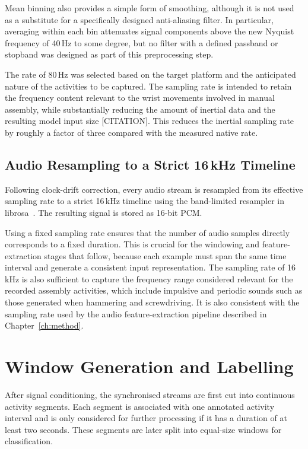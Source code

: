 Mean binning also provides a simple form of smoothing, although it is not used
as a substitute for a specifically designed anti-aliasing filter. In
particular, averaging within each bin attenuates signal components above the
new Nyquist frequency of 40\,Hz to some degree, but no filter with a defined
passband or stopband was designed as part of this preprocessing step.

The rate of 80\,Hz was selected based on the target platform and the
anticipated nature of the activities to be captured. The sampling rate is
intended to retain the frequency content relevant to the wrist movements
involved in manual assembly, while substantially reducing the amount of
inertial data and the resulting model input size {[}CITATION{]}. This
reduces the inertial sampling rate by roughly a factor of three compared with
the measured native rate.

\subsection{Audio Resampling to a Strict 16\,kHz Timeline}
\label{sec:resample}

Following clock-drift correction, every audio stream is resampled from its
effective sampling rate to a strict 16\,kHz timeline using the band-limited
resampler in librosa~\cite{mcfee2015librosa}. The resulting signal is stored as
16-bit PCM.

Using a fixed sampling rate ensures that the number of audio samples directly
corresponds to a fixed duration. This is crucial for the windowing and
feature-extraction stages that follow, because each example must span the same
time interval and generate a consistent input representation. The sampling
rate of 16\,kHz is also sufficient to capture the frequency range considered
relevant for the recorded assembly activities, which include impulsive and
periodic sounds such as those generated when hammering and screwdriving. It is
also consistent with the sampling rate used by the audio feature-extraction
pipeline described in Chapter~\ref{ch:method}.

\section{Window Generation and Labelling}
\label{sec:windowing}

After signal conditioning, the synchronised streams are first cut into
continuous activity segments. Each segment is associated with one annotated
activity interval and is only considered for further processing if it has a
duration of at least two seconds. These segments are later split into
equal-size windows for classification.

